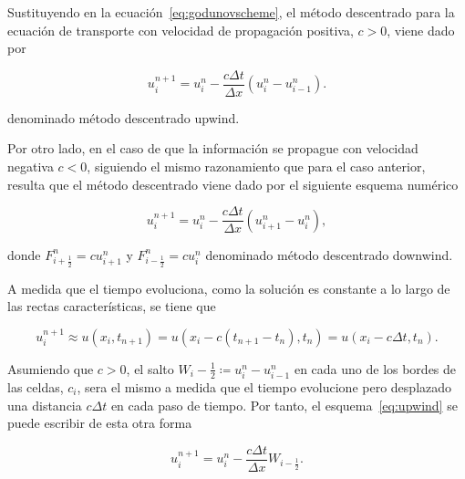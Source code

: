 Sustituyendo en la ecuación~\eqref{eq:godunovscheme}, el método
descentrado para la ecuación de transporte con velocidad de
propagación positiva, $c>0$, viene dado por

\begin{equation}\label{eq:upwind}
  u^{n+1}_{i}=
  u^{n}_{i}-
  \frac{c\Delta t}{\Delta x}
  \left(
  u^{n}_{i}-
  u^{n}_{i-1}
  \right).
\end{equation}

denominado método descentrado upwind.

Por otro lado, en el caso de que la información se propague con
velocidad negativa $c<0$, %
siguiendo el mismo razonamiento que para el caso anterior, resulta
que el método descentrado viene dado por el siguiente esquema
numérico

\begin{equation}\label{eq:downwind}
  u^{n+1}_{i}=
  u^{n}_{i}-
  \frac{c\Delta t}{\Delta x}
  \left(
  u^{n}_{i+1}-
  u^{n}_{i}
  \right),
\end{equation}

donde
\begin{math}
  F^{n}_{i+\frac{1}{2}}=
  cu^{n}_{i+1}
\end{math}
y
\begin{math}
  F^{n}_{i-\frac{1}{2}}=
  cu^{n}_{i}
\end{math}
denominado método descentrado downwind.

A medida que el tiempo evoluciona, como la solución es constante a lo
largo de las rectas características, se tiene que

\begin{equation*}
  u^{n+1}_{i}\approx
  u
  \left(x_{i},t_{n+1}\right)=
  u
  \left(
  x_{i}-
  c\left(t_{n+1}-t_{n}\right),
  t_{n}
  \right)=
  u
  \left(
  x_{i}-
  c\Delta t,t_{n}
  \right).
\end{equation*}

Asumiendo que $c>0$, el salto
\begin{math}
  W_{i}-\frac{1}{2}\coloneqq
  u^{n}_{i}-
  u_{i-1}^{n}
\end{math}
en cada uno de los bordes de las celdas, $c_{i}$, sera el mismo a
medida que el tiempo evolucione pero desplazado una distancia
$c\Delta t$ en cada paso de tiempo.
Por tanto, el esquema~\eqref{eq:upwind} se puede escribir de esta
otra forma

\begin{equation*}
  u^{n+1}_{i}=
  u^{n}_{i}-
  \frac{c\Delta t}{\Delta x}
  W_{i-\frac{1}{2}}.
\end{equation*}

